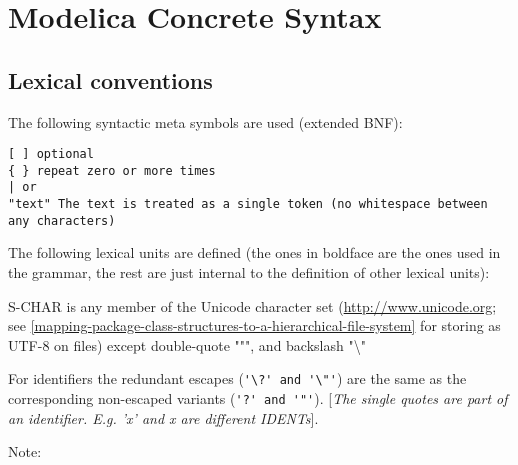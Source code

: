 \chapter{Modelica Concrete Syntax}
\section{Lexical conventions}

The following syntactic meta symbols are used (extended BNF):
\begin{lstlisting}[language=grammar]
[ ] optional
{ } repeat zero or more times
| or
"text" The text is treated as a single token (no whitespace between any characters)
\end{lstlisting}

The following lexical units are defined (the ones in boldface are the
ones used in the grammar, the rest are just internal to the definition
of other lexical units):



\textrm{S-CHAR} is any member of the Unicode character set
(\url{http://www.unicode.org}; see \autoref{mapping-package-class-structures-to-a-hierarchical-file-system} for storing as UTF-8 on files) except double-quote """, and backslash "\textbackslash{}"

For identifiers the redundant escapes (\lstinline!'\?' and '\"'!) are the same as the corresponding non-escaped
variants (\lstinline!'?' and '"'!). {[}\emph{The single quotes are part of an
identifier. E.g. 'x' and x are different IDENTs}{]}.

Note:

